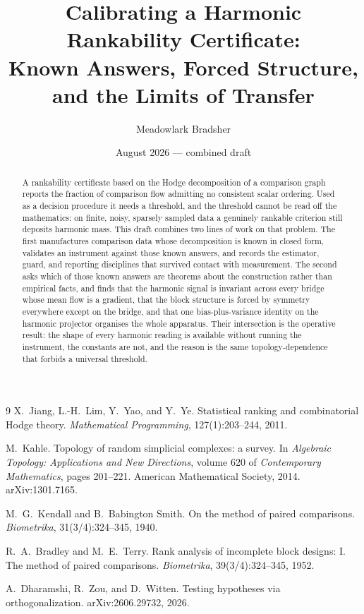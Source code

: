 \documentclass[11pt,a4paper]{article}
\title{\vspace{-1.5em}Calibrating a Harmonic Rankability Certificate:\\
Known Answers, Forced Structure, and the Limits of Transfer}
\author{Meadowlark Bradsher}
\date{August 2026 --- combined draft}
\theoremstyle{definition}\newtheorem{definition}{Definition}
\theoremstyle{remark}\newtheorem{remark}{Remark}
\begin{document}
\maketitle

\begin{abstract}
\noindent
A rankability certificate based on the Hodge decomposition of a comparison graph
reports the fraction of comparison flow admitting no consistent scalar ordering.
Used as a decision procedure it needs a threshold, and the threshold cannot be
read off the mathematics: on finite, noisy, sparsely sampled data a genuinely
rankable criterion still deposits harmonic mass. This draft combines two lines of
work on that problem. The first manufactures comparison data whose decomposition
is known in closed form, validates an instrument against those known answers, and
records the estimator, guard, and reporting disciplines that survived contact
with measurement. The second asks which of those known answers are theorems about
the construction rather than empirical facts, and finds that the harmonic signal
is invariant across every bridge whose mean flow is a gradient, that the block
structure is forced by symmetry everywhere except on the bridge, and that one
bias-plus-variance identity on the harmonic projector organises the whole
apparatus. Their intersection is the operative result: the shape of every
harmonic reading is available without running the instrument, the constants are
not, and the reason is the same topology-dependence that forbids a universal
threshold.
\end{abstract}

\tableofcontents
\bigskip



\begin{thebibliography}{9}
X.~Jiang, L.-H.~Lim, Y.~Yao, and Y.~Ye.
\newblock Statistical ranking and combinatorial Hodge theory.
\newblock \emph{Mathematical Programming}, 127(1):203--244, 2011.

M.~Kahle.
\newblock Topology of random simplicial complexes: a survey.
\newblock In \emph{Algebraic Topology: Applications and New Directions},
volume 620 of \emph{Contemporary Mathematics}, pages 201--221. American
Mathematical Society, 2014. \newblock arXiv:1301.7165.

M.~G.~Kendall and B.~Babington Smith.
\newblock On the method of paired comparisons.
\newblock \emph{Biometrika}, 31(3/4):324--345, 1940.

R.~A.~Bradley and M.~E.~Terry.
\newblock Rank analysis of incomplete block designs: I. The method of paired
comparisons.
\newblock \emph{Biometrika}, 39(3/4):324--345, 1952.

A.~Dharamshi, R.~Zou, and D.~Witten.
\newblock Testing hypotheses via orthogonalization.
\newblock arXiv:2606.29732, 2026.
\end{thebibliography}
\end{document}
